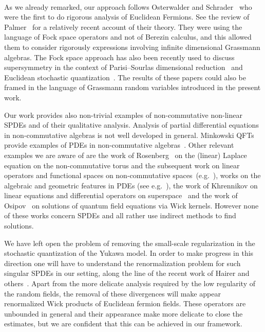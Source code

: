 \documentclass{article}
\begin{document}
\

As we already remarked, our approach follows Osterwalder and
Schrader~{\cite{osterwalder_euclidean_1973,osterwalder_euclidean_1973-2}} who
were the first to do rigorous analysis of Euclidean Fermions. See the review
of Palmer~{\cite{palmer_euclidean_1980}} for a relatively recent account of
their theory. They were using the language of Fock space operators and not of
Berezin calculus, and this allowed them to consider rigorously expressions
involving infinite dimensional Grassmann algebras. The Fock space approach has
also been recently used to discuss supersymmetry in the context of
Parisi--Sourlas dimensional
reduction~{\cite{klein_supersymmetry_1983,klein_supersymmetry_1985}} and
Euclidean stochastic
quantization~{\cite{albeverio_elliptic_2018,albeverio_elliptic_2019,de_vecchi_note_2019}}.
The results of these papers could also be framed in the language of Grassmann
random variables introduced in the present work.

Our work provides also non-trivial examples of non-commutative non-linear
SPDEs and of their qualitative analysis. Analysis of partial differential
equations in non-commutative algebras is not well developed in general.
Minkowski QFTs provide examples of PDEs in non-commutative
algebras~{\cite{Segalbook}}. Other relevant examples we are aware of are the
work of Rosenberg~{\cite{rosenberg_noncommutative_2008}} on the (linear)
Laplace equation on the non-commutative torus and the subsequent work on
linear operators and functional spaces on non-commutative
spaces~(e.g.~{\cite{savin_noncommutative_2010,xiong_sobolev_2018}}), works on
the algebraic and geometric features in PDEs (see
e.g.~{\cite{prastaro_geometry_1994,connes_noncommutative_1994}}), the work of
Khrennikov on linear equations and differential operators on
superspace~{\cite{khrennikov_equations_1991}} and the work of
Osipov~{\cite{osipov_quantum_2000}} on solutions of quantum field equations
via Wick kernels. However none of these works concern SPDEs and all rather use
indirect methods to find solutions.

We have left open the problem of removing the small-scale regularization in
the stochastic quantization of the Yukawa model. In order to make progress in
this direction one will have to understand the renormalization problem for
such singular SPDEs in our setting, along the line of the recent work of
Hairer and
others~{\cite{hairer_theory_2014,gubinelli_paracontrolled_2015,kupiainen_renormalization_2016}}.
Apart from the more delicate analysis required by the low regularity of the
random fields, the removal of these divergences will make appear renormalized
Wick products of Euclidean fermion fields. These operators are unbounded in
general and their appearance make more delicate to close the estimates, but we
are confident that this can be achieved in our framework.
\end{document}
